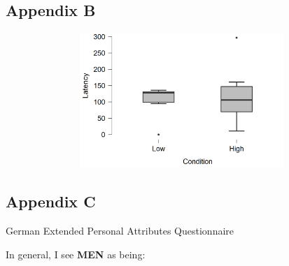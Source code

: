 \documentclass[serif, authorddate, twocolumn, empirical]{jote-article}
\begin{document}

{}
\subsection*{\hypertarget{B}{Appendix B}} 
\begin{Center}

\end{Center}
\begin{figure}[H]
	\centering
	\includegraphics[width=5.54in,height=2.01in]{media/image2.png}
\end{figure}

\newpage
{}
{}
\subsection*{\hypertarget{C}{Appendix C}}

\begin{Center}
German Extended Personal Attributes Questionnaire
\end{Center}

In general, I see \textbf{MEN} as being:



\end{document}
